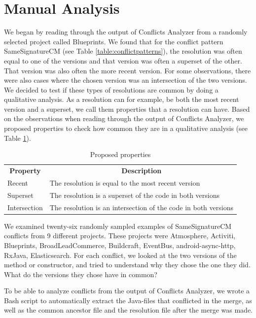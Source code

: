 {\section{Manual Analysis}\label{sec:manual}
\FloatBarrier
We began by reading through the output of Conflicts Analyzer from a randomly selected project called Blueprints. We found that for the conflict pattern SameSignatureCM (see Table \ref{table:conflictpatterns}), the resolution was often equal to one of the versions and that version was often a superset of the other. That version was also often the more recent version. For some observations, there were also cases where the chosen version was an intersection of the two versions. We decided to test if these types of resolutions are common by doing a qualitative analysis. As a resolution can for example, be both the most recent version and a superset, we call them properties that a resolution can have. Based on the observations when reading through the output of Conflicts Analyzer, we proposed properties to check how common they are in a qualitative analysis (see Table \ref{table:pproperties}).
\begin{table}
\caption{Proposed properties}\label{table:pproperties}
\begin{tabular}{ p{7cm} p{7cm} }
\hline
\multicolumn{1}{c}{\textbf{Property}} & \multicolumn{1}{c}{\textbf{Description}}\\
Recent & The resolution is equal to the most recent version\\
Superset & The resolution is a superset of the code in both versions\\
Intersection & The resolution is an intersection of the code in both versions\\
\end{tabular}
\end{table}
\FloatBarrier

We examined twenty-six randomly sampled examples of SameSignatureCM conflicts from 9 different projects. These projects were Atmosphere, Activiti, Blueprints, BroadLeadCommerce, Buildcraft, EventBus, android-async-http, RxJava, Elasticsearch. For each conflict, we looked at the two versions of the method or constructor, and tried to understand why they chose the one they did. What do the versions they chose have in common?

To be able to analyze conflicts from the output of Conflicts Analyzer, we wrote a Bash script to automatically extract the Java-files that conflicted in the merge, as well as the common ancestor file and the resolution file after the merge was made.

}
